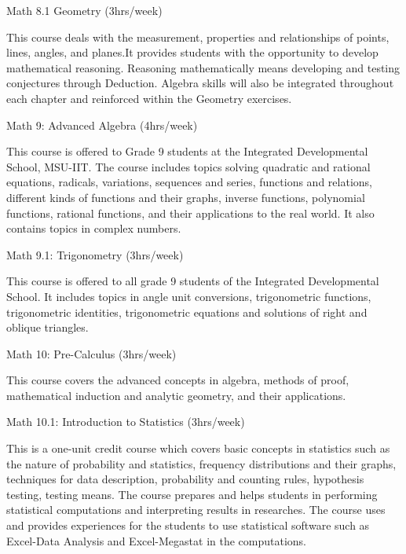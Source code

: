 \begin{subject} Math 8.1 Geometry
	\hfill
	(3hrs/week)
\end{subject}
This course deals with the measurement, properties and relationships of points, lines, angles, and planes.It provides students with the opportunity to develop mathematical reasoning. Reasoning mathematically means developing and testing conjectures through Deduction. Algebra skills will also be integrated throughout each chapter and reinforced within the Geometry exercises.

\begin{subject} Math 9: Advanced Algebra
	\hfill
	(4hrs/week)
\end{subject}
This course is offered to Grade 9 students at the Integrated Developmental School, MSU-IIT. The course includes topics solving quadratic and rational equations, radicals, variations, sequences and series, functions and relations, different kinds of functions and their graphs, inverse functions, polynomial functions, rational functions, and their applications to the real world. It also contains topics in complex numbers.

\begin{subject} Math 9.1: Trigonometry
	\hfill
	(3hrs/week)
\end{subject}
This course is offered to all grade 9 students of the Integrated Developmental School. It includes topics in angle unit conversions, trigonometric functions, trigonometric identities, trigonometric equations and solutions of right and oblique triangles.

\begin{subject} Math 10: Pre-Calculus
	\hfill
	(3hrs/week)
\end{subject}
This course covers the advanced concepts in algebra, methods of proof, mathematical induction and analytic geometry, and their applications. 

\begin{subject} Math 10.1: Introduction to Statistics
	\hfill
	(3hrs/week)
\end{subject}
This is a one-unit credit course which covers basic concepts in statistics such as the nature of probability and statistics, frequency distributions and their graphs, techniques for data description, probability and counting rules, hypothesis testing, testing means. The course prepares and helps students in performing statistical computations and interpreting results in researches. The course uses and provides experiences for the students to use statistical software such as Excel-Data Analysis and Excel-Megastat in the computations.

